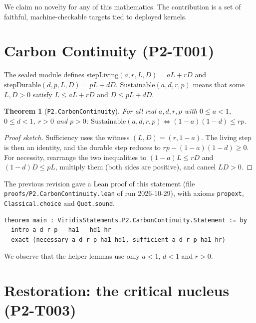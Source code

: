 \documentclass[11pt]{article}
\newtheorem{theorem}{Theorem}
\theoremstyle{definition}
\theoremstyle{remark}
\begin{document}
We claim no novelty for any of this mathematics. The contribution is a set of faithful, machine-checkable targets tied
to deployed kernels.

\section{Carbon Continuity (P2-T001)}
The sealed module defines $\mathrm{stepLiving}(a,r,L,D)=aL+rD$ and $\mathrm{stepDurable}(d,p,L,D)=pL+dD$.
$\mathrm{Sustainable}(a,d,r,p)$ means that some $L,D>0$ satisfy $L\le aL+rD$ and $D\le pL+dD$.
\begin{theorem}[\texttt{P2.CarbonContinuity}]
For all real $a,d,r,p$ with $0\le a<1$, $0\le d<1$, $r>0$ and $p>0$:
$\mathrm{Sustainable}(a,d,r,p)\iff (1-a)(1-d)\le rp$.
\end{theorem}
\begin{proof}[Proof sketch]
Sufficiency uses the witness $(L,D)=(r,1-a)$. The living step is then an identity, and the durable step reduces to
$rp-(1-a)(1-d)\ge 0$. For necessity, rearrange the two inequalities to $(1-a)L\le rD$ and $(1-d)D\le pL$,
multiply them (both sides are positive), and cancel $LD>0$.
\end{proof}
The previous revision gave a Lean proof of this statement (file \texttt{proofs/P2.CarbonContinuity.lean} of run
2026-10-29), with axioms \texttt{propext}, \texttt{Classical.choice} and \texttt{Quot.sound}.
\begin{lstlisting}
theorem main : ViridisStatements.P2.CarbonContinuity.Statement := by
  intro a d r p _ ha1 _ hd1 hr _
  exact ⟨necessary a d r p ha1 hd1, sufficient a d r p ha1 hr⟩
\end{lstlisting}
We observe that the helper lemmas use only $a<1$, $d<1$ and $r>0$.

\section{Restoration: the critical nucleus (P2-T003)}\label{sec:restoration}
\end{document}
